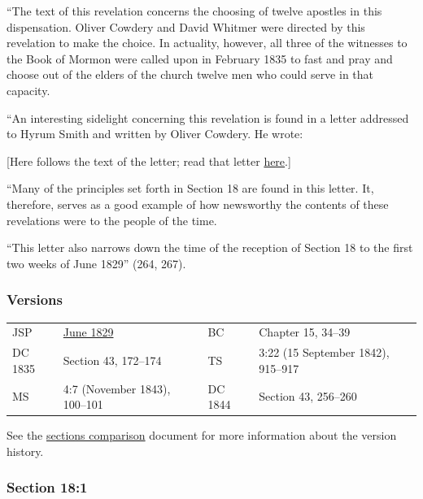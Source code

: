 			``The text of this revelation concerns the choosing of twelve apostles in this dispensation. Oliver Cowdery and David Whitmer were directed by this revelation to make the choice. In actuality, however, all three of the witnesses to the Book of Mormon were called upon in February 1835 to fast and pray and choose out of the elders of the church twelve men who could serve in that capacity.
			
			``An interesting sidelight concerning this revelation is found in a letter addressed to Hyrum Smith and written by Oliver Cowdery. He wrote:
			
			[Here follows the text of the letter; read that letter \hyperref[EMS-1828-1829-OC-14-JUN-1829]{here}.]
			
			``Many of the principles set forth in Section 18 are found in this letter. It, therefore, serves as a good example of how newsworthy the contents of these revelations were to the people of the time.
			
			``This letter also narrows down the time of the reception of Section 18 to the first two weeks of June 1829'' (264, 267).
			
	\subsubsection{Versions}
		\label{DC18-V}
	
		\begin{tabular}{p{1in}p{2in}p{1in}p{2in}}
			JSP		& \hyperref[EMS-1828-1829-JS-JUN-1829-B]{June 1829}		& BC & Chapter 15, 34--39 \\			DC 1835	& Section 43, 172--174									& TS & 3:22 (15 September 1842), 915--917 \\
			MS		& 4:7 (November 1843), 100--101 						& DC 1844 & Section 43, 256--260
		\end{tabular}
		
		\medskip
		
		See the \href{https://drive.google.com/file/d/1goAvNz8jS4R8slYfMG_db55Ty2z_vmgK/view?usp=sharing}{sections comparison} document for more information about the version history.

	\subsubsection{Section 18:1} %
		\label{DC18-1}

